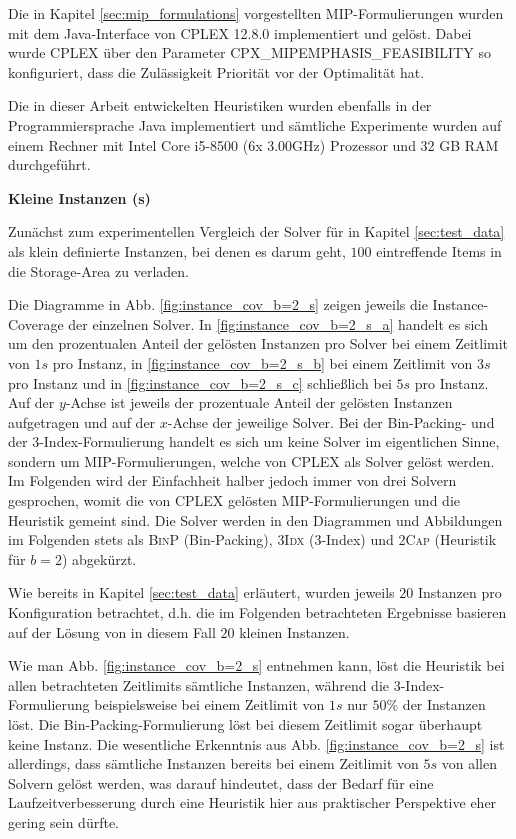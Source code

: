 Die in Kapitel \ref{sec:mip_formulations} vorgestellten MIP-Formulierungen wurden mit dem Java-Interface von CPLEX 12.8.0 implementiert
und gelöst. Dabei wurde CPLEX über den Parameter \textsc{CPX\_MIPEMPHASIS\_FEASIBILITY} so konfiguriert, dass die Zulässigkeit
Priorität vor der Optimalität hat.\cite{IBM_DOC}

Die in dieser Arbeit entwickelten Heuristiken wurden ebenfalls in der Programmiersprache Java implementiert
und sämtliche Experimente wurden auf einem Rechner mit Intel Core i5-8500 (6x 3.00GHz) Prozessor und 32 GB RAM durchgeführt.

\pagebreak

\textbf{Kleine Instanzen (s)}

Zunächst zum experimentellen Vergleich der Solver für in Kapitel \ref{sec:test_data} als klein definierte Instanzen,
bei denen es darum geht, $100$ eintreffende Items in die Storage-Area zu verladen.

Die Diagramme in Abb. \ref{fig:instance_cov_b=2_s} zeigen jeweils die Instance-Coverage der einzelnen Solver.
In \ref{fig:instance_cov_b=2_s_a} handelt es sich um den prozentualen Anteil der gelösten Instanzen pro Solver bei einem Zeitlimit
von $1s$ pro Instanz, in \ref{fig:instance_cov_b=2_s_b} bei einem Zeitlimit von $3s$ pro Instanz und in \ref{fig:instance_cov_b=2_s_c}
schließlich bei $5s$ pro Instanz.\newline
Auf der $y$-Achse ist jeweils der prozentuale Anteil der gelösten Instanzen aufgetragen und auf der $x$-Achse der jeweilige Solver.
Bei der Bin-Packing- und der 3-Index-Formulierung handelt es sich um keine Solver im eigentlichen Sinne,
sondern um MIP-Formulierungen, welche von CPLEX als Solver gelöst werden.
Im Folgenden wird der Einfachheit halber jedoch immer von drei Solvern gesprochen, womit die von
CPLEX gelösten MIP-Formulierungen und die Heuristik gemeint sind.
Die Solver werden in den Diagrammen und Abbildungen im Folgenden stets als \textsc{BinP} (Bin-Packing),
\textsc{3Idx} (3-Index) und \textsc{2Cap} (Heuristik für $b = 2$) abgekürzt.

Wie bereits in Kapitel \ref{sec:test_data} erläutert, wurden jeweils $20$ Instanzen pro Konfiguration betrachtet,
d.h. die im Folgenden betrachteten Ergebnisse basieren auf der Lösung von in diesem Fall $20$ kleinen Instanzen.

Wie man Abb. \ref{fig:instance_cov_b=2_s} entnehmen kann, löst die Heuristik bei allen betrachteten Zeitlimits sämtliche Instanzen,
während die 3-Index-Formulierung beispielsweise bei einem Zeitlimit von $1s$ nur $50 \%$ der Instanzen löst.
Die Bin-Packing-Formulierung löst bei diesem Zeitlimit sogar überhaupt keine Instanz.\newline
Die wesentliche Erkenntnis aus Abb. \ref{fig:instance_cov_b=2_s} ist allerdings, dass sämtliche Instanzen bereits bei einem Zeitlimit von $5s$
von allen Solvern gelöst werden, was darauf hindeutet, dass der Bedarf für eine Laufzeitverbesserung durch eine Heuristik hier
aus praktischer Perspektive eher gering sein dürfte.

